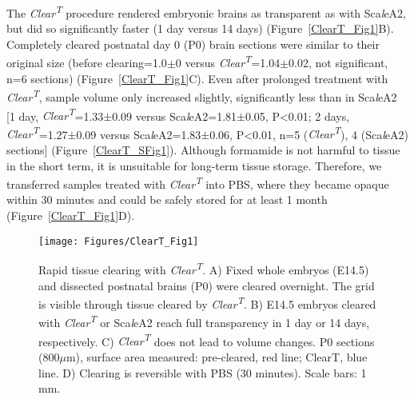 The \emph{Clear\textsuperscript{T}} procedure rendered embryonic brains as transparent as with Sca\emph{l}eA2, but did so significantly faster (1 day versus 14 days) (Figure~\ref{ClearT_Fig1}B).
Completely cleared postnatal day 0 (P0) brain sections were similar to their original size (before clearing=1.0$\pm$0 versus \emph{Clear\textsuperscript{T}}=1.04$\pm$0.02, not significant, n=6 sections) (Figure~\ref{ClearT_Fig1}C).
Even after prolonged treatment with \emph{Clear\textsuperscript{T}}, sample volume only increased slightly, significantly less than in Sca\emph{l}eA2 [1 day, \emph{Clear\textsuperscript{T}}=1.33$\pm$0.09 versus Sca\emph{l}eA2=1.81$\pm$0.05, P<0.01; 2 days, \emph{Clear\textsuperscript{T}}=1.27$\pm$0.09 versus Sca\emph{l}eA2=1.83$\pm$0.06, P<0.01, n=5 (\emph{Clear\textsuperscript{T}}), 4 (Sca\emph{l}eA2) sections] (Figure~\ref{ClearT_SFig1}).
Although formamide is not harmful to tissue in the short term, it is unsuitable for long-term tissue storage.
Therefore, we transferred samples treated with \emph{Clear\textsuperscript{T}} into PBS, where they became opaque within 30 minutes and could be safely stored for at least 1 month (Figure~\ref{ClearT_Fig1}D).
\begin{figure}[hbtp]
    \begin{center}
        \texttt{[image: Figures/ClearT\_Fig1]}
        \caption[Rapid tissue clearing with \emph{Clear\textsuperscript{T}}.]
        {Rapid tissue clearing with \emph{Clear\textsuperscript{T}}.
        A) Fixed whole embryos (E14.5) and dissected postnatal brains (P0) were cleared overnight.
        The grid is visible through tissue cleared by \emph{Clear\textsuperscript{T}}.
        B) E14.5 embryos cleared with \emph{Clear\textsuperscript{T}} or Sca\emph{l}eA2 reach full transparency in 1 day or 14 days,
        respectively.
        C) \emph{Clear\textsuperscript{T}} does not lead to volume changes.
        P0 sections (800$\mu$m), surface area measured: pre-cleared, red line; ClearT, blue line.
        D) Clearing is reversible with PBS (30 minutes).
        Scale bars: 1 mm.
        }
        \label{ClearTFig1}
    \end{center}
\end{figure}
